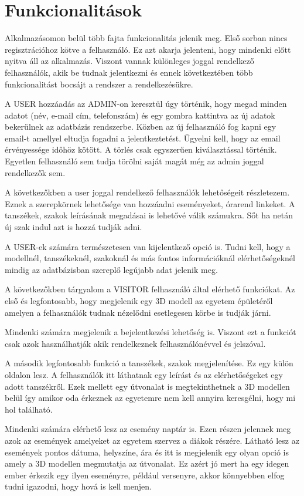 \section{Funkcionalitások}

Alkalmazásomon belül több fajta funkcionalitás jelenik meg. Első sorban nincs regisztrációhoz kötve a felhasználó. Ez azt akarja jelenteni, hogy mindenki előtt nyitva áll az alkalmazás. Viszont vannak különleges joggal rendelkező felhasználók, akik be tudnak jelentkezni és ennek következtében több funkcionalitást bocsájt a rendszer a rendelkezésükre.

A USER hozzáadás az ADMIN-on keresztül úgy történik, hogy megad minden adatot (név, e-mail cím, telefonszám) és egy gombra kattintva az új adatok bekerülnek az adatbázis rendszerbe. Közben az új felhasználó fog kapni egy email-t amellyel eltudja fogadni a jelentkeztetést. Ügyelni kell, hogy az email érvényessége időhöz kötött. A törlés csak egyszerűen kiválasztással történik. Egyetlen felhasználó sem tudja törölni saját magát még az admin joggal rendelkezők sem.

A következőkben a user joggal rendelkező felhasználók lehetőségeit részletezem. Eznek a szerepkörnek lehetősége van hozzáadni eseményeket, órarend linkeket. A tanszékek, szakok leírásának megadásai is lehetővé válik számukra. Sőt ha netán új szak indul azt is hozzá tudják adni.

A USER-ek számára természetesen van kijelentkező opció is. Tudni kell, hogy a modellnél, tanszékeknél, szakoknál és más fontos információknál elérhetőségeknél mindig az adatbázisban szereplő legújabb adat jelenik meg. 

A következőkben tárgyalom a VISITOR felhasználó által elérhető funkciókat. Az első és legfontosabb, hogy megjelenik egy 3D modell az egyetem épületéről amelyen a felhasználók tudnak nézelődni esetlegesen körbe is tudják járni.

Mindenki számára megjelenik a bejelentkezési lehetőség is. Viszont ezt a funkciót csak azok használhatják akik rendelkeznek felhasználónévvel és jelszóval.

A második legfontosabb funkció a tanszékek, szakok megjelenítése. Ez egy külön oldalon lesz. A felhasználók itt láthatnak egy leírást és az elérhetőségeket egy adott tanszékről. Ezek mellett egy útvonalat is megtekinthetnek a 3D modellen belül így amikor oda érkeznek az egyetemre nem kell annyira keresgélni, hogy mi hol található. 

Mindenki számára elérhető lesz az esemény naptár is. Ezen részen jelennek meg azok az események amelyeket az egyetem szervez a diákok részére. Látható lesz az események pontos dátuma, helyszíne, ára és itt is megjelenik egy olyan opció is amely a 3D modellen megmutatja az útvonalat. Ez azért jó mert ha egy idegen ember érkezik egy ilyen eseményre, például versenyre, akkor könnyebben elfog tudni igazodni, hogy hová is kell menjen.

